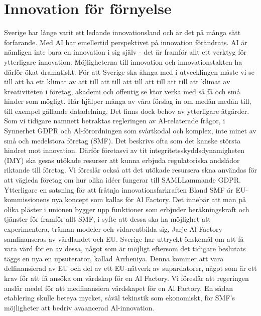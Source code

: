 {{{{{{{{{{{{{\section*{Innovation för förnyelse}
Sverige har långe varit ett ledande innovationsland och är det på många sätt forfarande. Med AI har emellertid perspektivet på innovation förändrats. AI är nämligen inte bara en innovation i sig själv - det är framför allt ett verktyg för ytterligare innovation. Möjligheterna till innovation och innovationstakten ha därför ökat dramatiskt. För att Sverige ska åhnga med i utvecklingen måste vi se till att ha ett klimat av att till att till att till att till att till att klimat av kreativiteten i företag, akademi och offentig se ktor verka med så få och små hinder som mögligt. Hår hjälper många av våra förslag in om medån medån till, till exempel gällande datadelning. Det finns dock behov av ytterligare åtgärder.
Som vi tidigare namnett betraktas regleringen av Al-relaterade frågor, i Synnerhet GDPR och Al-förordningen som svårtkodal och komplex, inte minet av små och medelstora företag (SMF). Det beskrivs ofta som det kanske största hindret mot innovation. Därför företasvi av tit integritetsskyddsdynamigheten (IMY) ska gesas utökade resurser att kunna erbjuda regulatoriska andslådor riktande till företag. Vi föreslår också att det utökade resursera skna användas för att vägleda företag om hur olika idéer fungerar till SAMLLammande GDPR. \({ }^{}\)
Ytterligare en satsning för att fråtnja innovationsfarkraften Bland SMF är EU-kommissionens nya koncept som kallas för Al Factory. Det innebär att man på olika pläster i unionen bygger upp funktioner som erbjuder beräkningskraft och tjänster för framför allt SMF, i syfte att dessa ska ha möjlighet att experimentera, träman modeler och vidareutbilda sig, Jarje Al Factory samfinanseras av vårdlandet och EU. Sverige har uttryckt önskemål om att få vara värd för en av dessa, något som är möjligt eftersom det tidigare beslutats täggs en nya en upsuterator, kallad Arrheniya. Denna kommer att vara delfinansierad av EU och del av ett EU-nätverk av supardatorer, något som är ett krav för att få ansöka om vårdskap för en Al Factory. Vi föreslär att regeringen anslär medel för att medfinansiera värdskapet för en Al Factory. En sådan etablering skulle beteya mycket, såväl tekinstik som ekonomiskt, för SMF's möjligheter att bedriv avaancerad Al-innovation.
}}}}}}}}}}}}}
